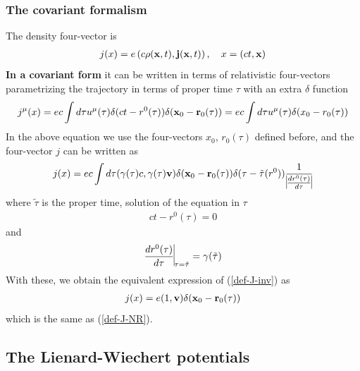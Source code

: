 \subsubsection{The covariant formalism}
The density four-vector is
\begin{align}
    j(x)=e\left(c\rho({\bf x},t),{\bf j}({\bf x},t)\right),\quad x=(ct,{\bf x})
\end{align}
{\bf In a covariant form} it can be written in terms of relativistic four-vectors parametrizing the trajectory in terms of proper time $\tau$ with an extra $\delta$ function
\begin{align}
    j^{\mu}(x)=ec \int d\tau u^{\mu}(\tau)\delta(ct-r^0(\tau))\delta({\bf x}_0-{\bf r}_0(\tau))=ec \int d\tau u^{\mu}(\tau)\delta(x_0-r_0(\tau))\label{def-J-inv}
\end{align}
In the above equation we use  the four-vectors $x_0$, $r_0(\tau)$ defined before, and the four-vector $j$ can be written as
\begin{align}
    j(x)=ec\int d\tau (\gamma(\tau)c, \gamma(\tau)  {\bf v})\delta({\bf x}_0-{\bf r}_0(\tau))\delta(\tau-\tilde\tau(r^0))\frac1{\vline\frac{dr^0(\tau)}{d\tau}\vline}
\end{align}
where $\tilde\tau$ is the proper time, solution of the equation in $\tau$
\begin{align}
    ct-r^{0}(\tau)=0
\end{align}
and
\begin{align}
    {\frac{dr^0(\tau)}{d\tau}\vline}_{\tau=\tilde\tau}=\gamma(\tilde\tau)
\end{align}
With these, we obtain the equivalent expression of (\ref{def-J-inv}) as
\begin{align}
    j(x)=e (1,  {\bf v})\delta({\bf x}_0-{\bf r}_0(\tau))
\end{align}
which is the same as (\ref{def-J-NR}).
\subsection{The Lienard-Wiechert potentials}

